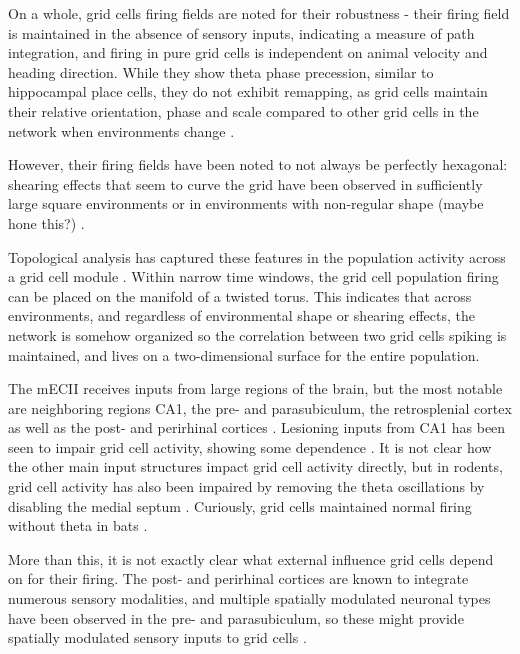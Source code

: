 \documentclass{article}
\begin{document}
    On a whole, grid cells firing fields are noted for their robustness - their firing field is maintained in the absence of sensory inputs, indicating a measure of path integration, and firing in pure grid cells is independent on animal velocity and heading direction. While they show theta phase precession, similar to hippocampal place cells, they do not exhibit remapping, as grid cells maintain their relative orientation, phase and scale compared to other grid cells in the network when environments change \parencite{Hafting2008, Fyhn2007}. 

    However, their firing fields have been noted to not always be perfectly hexagonal: shearing effects that seem to curve the grid have been observed in sufficiently large square environments or in environments with non-regular shape (maybe hone this?) \parencite{Stensola2015,Krupic2015}.

    Topological analysis has captured these features in the population activity across a grid cell module \parencite{Gardner2022}. Within narrow time windows, the grid cell population firing can be placed on the manifold of a twisted torus. This indicates that across environments, and regardless of environmental shape or shearing effects, the network is somehow organized so the correlation between two grid cells spiking is maintained, and lives on a two-dimensional surface for the entire population.

    The mECII receives inputs from large regions of the brain, but the most notable are neighboring regions CA1, the pre- and parasubiculum, the retrosplenial cortex as well as the post- and perirhinal cortices \parencite{Kerr2007}. Lesioning inputs from CA1 has been seen to impair grid cell activity, showing some dependence \parencite{Bonnevie2013}. It is not clear how the other main input structures impact grid cell activity directly, but in rodents, grid cell activity has also been impaired by removing the theta oscillations by disabling the medial septum \parencite{Brandon2011,Koenig2011}. Curiously, grid cells maintained normal firing without theta in bats \parencite{Yartsev2011}.

    More than this, it is not exactly clear what external influence grid cells depend on for their firing. The post- and perirhinal cortices are known to integrate numerous sensory modalities, and multiple spatially modulated neuronal types have been observed in the pre- and parasubiculum, so these might provide spatially modulated sensory inputs to grid cells \parencite{Furtak2007,Groen1990}.
\end{document}
